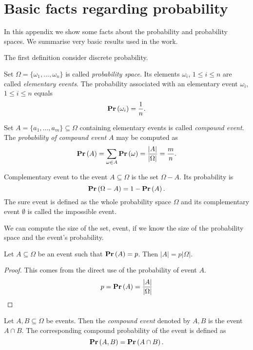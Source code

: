 \chapter{Basic facts regarding probability}
In this appendix we show some facts about the probability and probability spaces. We summarise very basic results used in the work.

The first definition consider discrete probability.

\begin{definition}
Set $\Omega = \{\omega_1, \dots, \omega_n \}$ is called \emph{probability space}. Its elements $\omega_i$, $1 \leq i \leq n$ are called \emph{elementary events}. The probability associated with an elementary event $\omega_i$, $1 \leq i \leq n$ equals \[ \mathbf{Pr}\left(\omega_i\right) = \frac{1}{n} \text{.} \]
\end{definition}

\begin{definition}
Set $A = \{a_1, \dots, a_m \}\subseteq \Omega$ containing elementary events is called \emph{compound event}. The \emph{probability of compound event $A$} may be computed as \[ \mathbf{Pr}\left(A\right) = \displaystyle\sum_{\omega \in A} \mathbf{Pr}\left(\omega\right) = \frac{|A|}{|\Omega|} = \frac{m}{n} \text{.} \]
\end{definition}

\begin{definition}
Complementary event to the event $A \subseteq \Omega$ is the set $\Omega - A$. Its probability is \[ \mathbf{Pr}\left(\Omega - A\right) = 1 - \mathbf{Pr}\left(A\right) \text{.} \] The sure event is defined as the whole probability space $\Omega$ and its complementary event $\emptyset$ is called the impossible event.
\end{definition}

We can compute the size of the set, event, if we know the size of the probability space and the event's probability.

\begin{lemma}
Let $A \subseteq \Omega$ be an event such that $\mathbf{Pr}\left(A\right) = p$. Then $|A| = p |\Omega|$.
\end{lemma}
\begin{proof}
This comes from the direct use of the probability of event $A$.
\[
p = \mathbf{Pr}\left(A\right) = \frac{|A|}{|\Omega|}
\]
\end{proof}

\begin{definition}
Let $A, B \subseteq \Omega$ be events. Then the \emph{compound event} denoted by $A, B$ is the event $A \cap B$. The corresponding compound probability of the event is defined as
\[
\mathbf{Pr}\left(A, B\right) = \mathbf{Pr}\left(A \cap B\right) \text{.}
\]
\end{definition}

